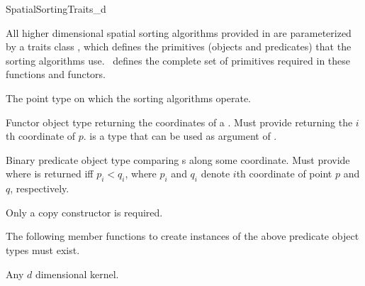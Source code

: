 

\begin{ccRefConcept}{SpatialSortingTraits_d}

\ccDefinition
  
All higher dimensional spatial sorting algorithms provided in \cgal{} are parameterized
by a traits class , which defines the
primitives (objects and predicates) that the sorting algorithms use.
\ccRefName\ defines the complete set of primitives required in these
functions and functors.

\ccTypes
\ccAutoIndexingOff
{}

%
       {The point type on which the sorting algorithms operate.
       }


%
       {Functor object type returning the coordinates of a  .
       Must provide 
          returning the $i$th
        coordinate of $p$.  is a type that can be used as
        argument of .
       }


%
       {Binary predicate object type comparing s
        along some coordinate.
        Must provide 
         where 
        is returned iff $p_i < q_i$,
        where $p_i$ and $q_i$ denote $i$th coordinate of point $p$ and $q$,
        respectively.
       }

\ccCreation
{}  %

Only a copy constructor is required.


\ccOperations

The following member functions to create instances of the above predicate
object types must exist. 

\setlength\parskip{0mm}

\ccParDims
\ccHasModels

Any \cgal{} $d$ dimensional kernel.

\ccParDims
\end{ccRefConcept}


